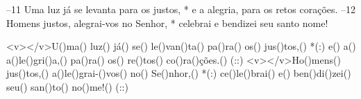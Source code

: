 –11 Uma luz já se levanta para os justos, *
e a alegria, para os retos corações.
–12 Homens justos, alegrai-vos no Senhor, *
celebrai e bendizei seu santo nome!

<v></v>U()ma() luz() já() se() le()van()ta() pa()ra() os() jus()tos,() *(:)
e() a() a()le()gri()a,() pa()ra() os() re()tos() co()ra()ções.() (::)
<v></v>Ho()mens() jus()tos,() a()le()grai-()vos() no() Se()nhor,() *(:)
ce()le()brai() e() ben()di()zei() seu() san()to() no()me!() (::)